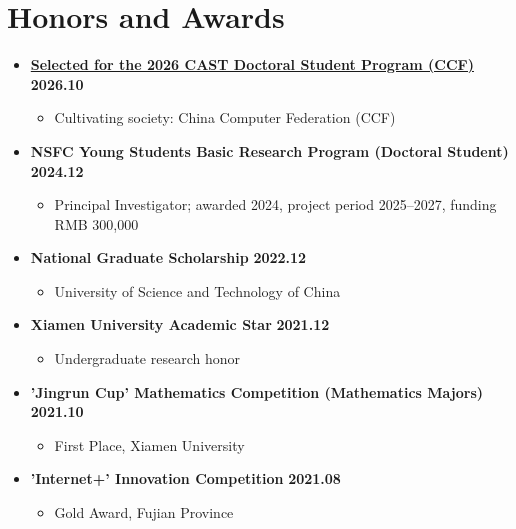 \documentclass{resume}
\begin{document}
\section{\makebox[.75em][c]{\faTrophy} \textbf{Honors and Awards}}
\vspace{.5mm}
\begin{itemize}[leftmargin=0em, itemsep=3pt]
    \item \textbf{\href{https://ydchen0806.github.io/docs/cast_ccf_2026_selection_proof.png}{Selected for the 2026 CAST Doctoral Student Program (CCF)}} \hfill \textbf{2026.10}
    \begin{itemize}[leftmargin=1.5em]
        \item Cultivating society: China Computer Federation (CCF)
    \end{itemize}

    \item \textbf{NSFC Young Students Basic Research Program (Doctoral Student)} \hfill \textbf{2024.12}
    \begin{itemize}[leftmargin=1.5em]
        \item Principal Investigator; awarded 2024, project period 2025--2027, funding RMB 300,000
    \end{itemize}

    \item \textbf{National Graduate Scholarship} \hfill \textbf{2022.12}
    \begin{itemize}[leftmargin=1.5em]
        \item University of Science and Technology of China
    \end{itemize}

    \item \textbf{Xiamen University Academic Star} \hfill \textbf{2021.12}
    \begin{itemize}[leftmargin=1.5em]
        \item Undergraduate research honor
    \end{itemize}

    \item \textbf{'Jingrun Cup' Mathematics Competition (Mathematics Majors)} \hfill \textbf{2021.10}
    \begin{itemize}[leftmargin=1.5em]
        \item First Place, Xiamen University
    \end{itemize}

    \item \textbf{'Internet+' Innovation Competition} \hfill \textbf{2021.08}
    \begin{itemize}[leftmargin=1.5em]
        \item Gold Award, Fujian Province
    \end{itemize}


\end{itemize}
\end{document}
